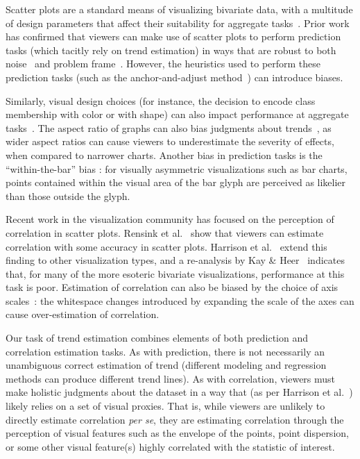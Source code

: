 \documentclass{sigchi}
\begin{document}
Scatter plots are a standard means of visualizing bivariate data, with a multitude of design parameters that affect their suitability for aggregate tasks~\cite{cleveland1984many}. Prior work has confirmed that viewers can make use of scatter plots to perform prediction tasks (which tacitly rely on trend estimation) in ways that are robust to both noise~\cite{harvey1997effects} and problem frame~\cite{lewandowsky2011popular}. However, the heuristics used to perform these prediction tasks (such as the anchor-and-adjust method~\cite{bolger1993context}) can introduce biases.

Similarly, visual design choices (for instance, the decision to encode class membership with color or with shape) can also impact performance at aggregate tasks~\cite{gleicher2013perception,lewandowsky1989discriminating}. The aspect ratio of graphs can also bias judgments about trends~\cite{beattie2002impact}, as wider aspect ratios can cause viewers to underestimate the severity of effects, when compared to narrower charts. Another bias in prediction tasks is the ``within-the-bar'' bias \cite{newman2012bar}: for visually asymmetric visualizations such as bar charts, points contained within the visual area of the bar glyph are perceived as likelier than those outside the glyph.

Recent work in the visualization community has focused on the perception of correlation in scatter plots. Rensink et al.~\cite{rensink2010perception} show that viewers can estimate correlation with some accuracy in scatter plots. Harrison et al.~\cite{harrison2014ranking} extend this finding to other visualization types, and a re-analysis by Kay \& Heer~\cite{kay2016beyond} indicates that, for many of the more esoteric bivariate visualizations, performance at this task is poor. Estimation of correlation can also be biased by the choice of axis scales~\cite{cleveland1982variables}: the whitespace changes introduced by expanding the scale of the axes can cause over-estimation of correlation.

Our task of trend estimation combines elements of both prediction and correlation estimation tasks. As with prediction, there is not necessarily an unambiguous correct estimation of trend (different modeling and regression methods can produce different trend lines). As with correlation, viewers must make holistic judgments about the dataset in a way that (as per Harrison et al.~\cite{harrison2014ranking}) likely relies on a set of visual proxies. That is, while viewers are unlikely to directly estimate correlation \emph{per se}, they are estimating correlation through the perception of visual features such as the envelope of the points, point dispersion, or some other visual feature(s) highly correlated with the statistic of interest.
\end{document}
